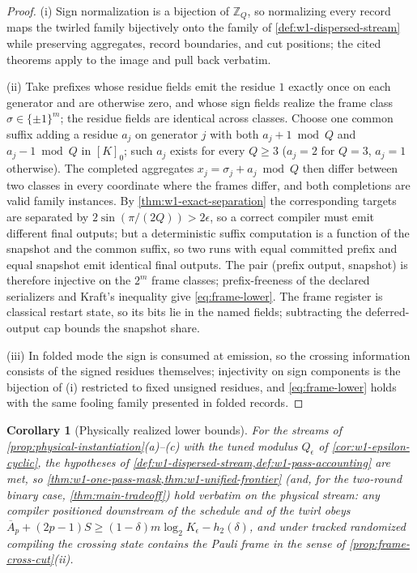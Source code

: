 \documentclass[a4paper,twocolumn,10pt,unpublished]{quantumarticle}
\newtheorem{corollary}{Corollary}
\begin{document}
\begin{proof}
(i) Sign normalization is a bijection of $\mathbb Z_Q$, so normalizing
every record maps the twirled family bijectively onto the family of
\cref{def:w1-dispersed-stream} while preserving aggregates, record
boundaries, and cut positions; the cited theorems apply to the image
and pull back verbatim.

(ii) Take prefixes whose residue fields emit the residue $1$ exactly
once on each generator and are otherwise zero, and whose sign fields
realize the frame class $\sigma\in\{\pm1\}^m$; the residue fields are
identical across classes.  Choose one common suffix adding a residue
$a_j$ on generator $j$ with both $a_j+1\bmod Q$ and $a_j-1\bmod Q$ in
$[K]_0$; such $a_j$ exists for every $Q\geq3$ ($a_j=2$ for $Q=3$,
$a_j=1$ otherwise).  The completed aggregates
$x_j=\sigma_j+a_j\bmod Q$ then differ between two classes in every
coordinate where the frames differ, and both completions are valid
family instances.  By \cref{thm:w1-exact-separation} the corresponding
targets are separated by $2\sin(\pi/(2Q))>2\epsilon$, so a correct
compiler must emit different final outputs; but a deterministic suffix
computation is a function of the snapshot and the common suffix, so two
runs with equal committed prefix and equal snapshot emit identical
final outputs.  The pair (prefix output, snapshot) is therefore
injective on the $2^m$ frame classes; prefix-freeness of the declared
serializers and Kraft's inequality give \eqref{eq:frame-lower}.  The
frame register is classical restart state, so its bits lie in the named
fields; subtracting the deferred-output cap bounds the snapshot share.

(iii) In folded mode the sign is consumed at emission, so the crossing
information consists of the signed residues themselves; injectivity on
sign components is the bijection of (i) restricted to fixed unsigned
residues, and \eqref{eq:frame-lower} holds with the same fooling family
presented in folded records.
\end{proof}

\begin{corollary}[Physically realized lower bounds]
\label{cor:physical-lower-bounds}
For the streams of \cref{prop:physical-instantiation}(a)--(c) with the
tuned modulus $Q_\epsilon$ of \cref{cor:w1-epsilon-cyclic}, the
hypotheses of \cref{def:w1-dispersed-stream,def:w1-pass-accounting} are
met, so \cref{thm:w1-one-pass-mask,thm:w1-unified-frontier} (and, for
the two-round binary case, \cref{thm:main-tradeoff}) hold verbatim on
the physical stream: any compiler positioned downstream of the schedule
and of the twirl obeys
$\overline A_p+(2p-1)S\geq(1-\delta)m\log_2K_\epsilon-h_2(\delta)$, and
under tracked randomized compiling the crossing state contains the
Pauli frame in the sense of \cref{prop:frame-cross-cut}(ii).
\end{corollary}
\end{document}
